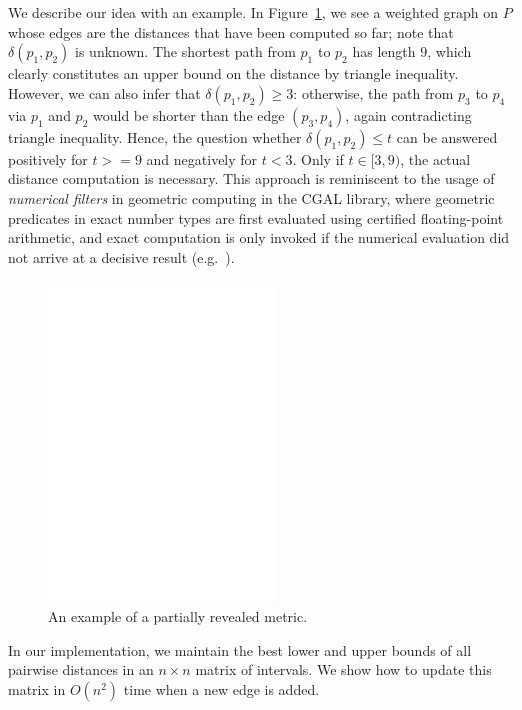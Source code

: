 \documentclass[10pt]{article}
\newcommand{\metric}{\delta}
\newcommand{\complexity}{C_{\metric}}
\begin{document}
We describe our idea with an example. In Figure~\ref{fig:1st_example},
we see a weighted graph on $P$ whose edges are the distances that have
been computed so far; note that $\metric(p_1,p_2)$ is unknown. 
The shortest path from $p_1$ to $p_2$ has length $9$, which clearly
constitutes an upper bound on the distance by triangle inequality.
However, we can also infer that $\metric(p_1,p_2)\geq 3$:
otherwise, the path from $p_3$ to $p_4$ via $p_1$ and $p_2$
would be shorter than the edge $(p_3,p_4)$, again contradicting
triangle inequality.
Hence, the question whether $\metric(p_1,p_2)\leq t$ can be answered positively
for $t>=9$ and negatively for $t<3$. Only if $t\in[3,9)$, the actual
distance computation is necessary. This approach is reminiscent to the usage
of \emph{numerical filters} in geometric computing in the CGAL library,
where geometric predicates in exact number types are first evaluated using 
certified floating-point arithmetic, and exact computation is only
invoked if the numerical evaluation did not arrive at a decisive result
(e.g.~\cite{bbp-interval,kerber-phd}).

\begin{figure}[h]

\centering
\includegraphics[width=6cm]{intro_example.eps}
\caption{An example of a partially revealed metric.}
\label{fig:1st_example}
\end{figure}

In our implementation, we maintain the best lower and upper bounds of all
pairwise distances in an $n\times n$ matrix of intervals. We show how to
update this matrix in $O(n^2)$ time when a new edge is added.
\end{document}
